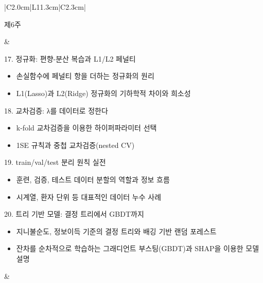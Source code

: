 \documentclass[11pt,a4paper]{article}
\begin{document}
\begin{longtable}{|C{2.0cm}|L{11.3cm}|C{2.3cm}|}
\hline

\begin{minipage}[t]{1.8cm}\centering 제6주\\[2mm]\hspace*{0mm}\end{minipage} & \begin{minipage}[t]{11.0cm}
17. 정규화: 편향-분산 복습과 L1/L2 페널티\\
\vspace{-1mm}\begin{itemize}[leftmargin=5mm,itemsep=0.2mm,topsep=0.5mm,parsep=0pt]
\item\small 손실함수에 페널티 항을 더하는 정규화의 원리
\item\small L1(Lasso)과 L2(Ridge) 정규화의 기하학적 차이와 희소성
\end{itemize}
\vspace{1mm}
18. 교차검증: λ를 데이터로 정한다\\
\vspace{-1mm}\begin{itemize}[leftmargin=5mm,itemsep=0.2mm,topsep=0.5mm,parsep=0pt]
\item\small k-fold 교차검증을 이용한 하이퍼파라미터 선택
\item\small 1SE 규칙과 중첩 교차검증(nested CV)
\end{itemize}
\vspace{1mm}
19. train/val/test 분리 원칙 실전\\
\vspace{-1mm}\begin{itemize}[leftmargin=5mm,itemsep=0.2mm,topsep=0.5mm,parsep=0pt]
\item\small 훈련, 검증, 테스트 데이터 분할의 역할과 정보 흐름
\item\small 시계열, 환자 단위 등 대표적인 데이터 누수 사례
\end{itemize}
\vspace{1mm}
20. 트리 기반 모델: 결정 트리에서 GBDT까지\\
\vspace{-1mm}\begin{itemize}[leftmargin=5mm,itemsep=0.2mm,topsep=0.5mm,parsep=0pt]
\item\small 지니불순도, 정보이득 기준의 결정 트리와 배깅 기반 랜덤 포레스트
\item\small 잔차를 순차적으로 학습하는 그래디언트 부스팅(GBDT)과 SHAP을 이용한 모델 설명
\end{itemize}
\vspace{1mm}
\end{minipage} & \begin{minipage}[t]{2.1cm}\centering \end{minipage} \\


\end{longtable}
\end{document}
